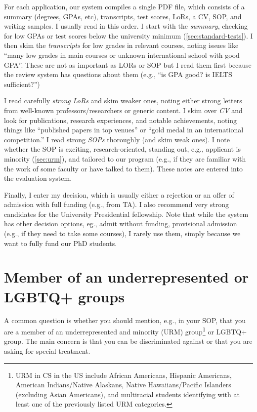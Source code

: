\documentclass[oneside,11pt,dvipsnames]{book}
\def\sectioninfo#1{%
  \addcontentsline{toc}{sectioninfo}{%
    \noexpand\numberline{}\color{black}{#1}}%
}
\begin{document}
For each application, our system compiles a single PDF file, which consists of a summary (degrees, GPAs, etc), transcripts, test scores, LoRs, a CV, SOP, and writing samples. I usually read in this order. I start with the \emph{summary}, checking for low GPAs or test scores below the university minimum (\autoref{sec:standard-tests}). I then skim the \emph{transcripts} for low grades in relevant courses, noting issues like ``many low grades in main courses or unknown international school with good GPA''.  These are not as important as LORs or SOP but I read them first because the review system has questions about them (e.g., ``is GPA good? is IELTS sufficient?'')

I read carefully \emph{strong LoRs} and skim weaker ones, noting either strong letters from well-known professors/researchers or generic content. I skim over \emph{CV} and look for publications, research experiences, and notable achievements, noting things like ``published papers in top venues'' or ``gold medal in an international competition.''
I read strong \emph{SOPs} thoroughly (and skim weak ones). I note whether the SOP is exciting, research-oriented, standing out, e.g., applicant is minority (\autoref{sec:urm}), and tailored to our program (e.g., if they are familiar with the work of some faculty or have talked to them). These notes are entered into the evaluation system.

Finally, I enter my decision, which is usually either a rejection or an offer of admission with full funding (e.g., from TA). I also recommend very strong candidates for the University Presidential fellowship. Note that while the system has other decision options, eg., admit without funding, provisional admission (e.g., if they need to take some courses), I rarely use them, simply because we want to fully fund our PhD students. 

\section{Member of an underrepresented or LGBTQ+ groups}\label{sec:urm}
\sectioninfo{Being a minority can make you stand out and help your application.}

A common question is whether you should mention, e.g., in your SOP, that you are a member of an underrepresented and minority (URM) group\footnote{URM in CS in the US include African Americans, Hispanic Americans, American Indians/Native Alaskans, Native Hawaiians/Pacific Islanders (excluding Asian Americans), and multiracial students identifying with at least one of the previously listed URM categories.} or LGBTQ+ group.
The main concern is that you can be discriminated against or that you are asking for special treatment.
\end{document}
